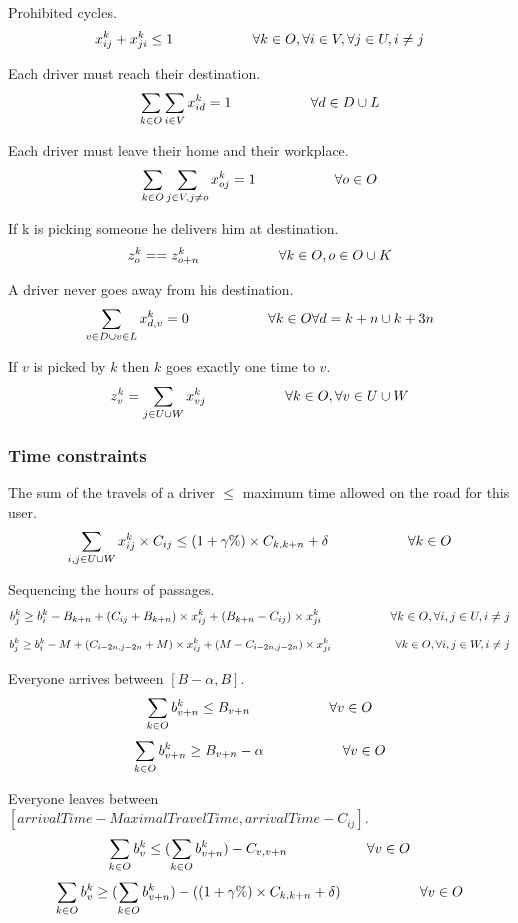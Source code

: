 \documentclass[12pt, a4paper, twoside]{memoir}
\newcommand\tab[1][1cm]{\hspace*{#1}}
\begin{document}
{	Prohibited cycles.
	\[ x^{k}_{ij}+x^{k}_{ji}\leq1\tab \tab \forall k\in O, \forall i\in V, \forall j\in U, i\ne j \]
	
	Each driver must reach their destination.
	\[ \sum_{\substack{k\in O}}\sum_{\substack{i \in V}} x^{k}_{id}=1 \tab \tab \forall d\in D\cup L \]
	
	Each driver must leave their home and their workplace. 
	\[ \sum_{\substack{k\in O}}\sum_{\substack{j \in V, j\ne o}} x^{k}_{oj}=1\tab \tab \forall o\in O \]

	If k is picking someone he delivers him at destination.
	\[ z^{k}_{o}==z^{k}_{o+n}\tab \tab \forall k\in O, o\in O\cup K \] 
	
	A driver never goes away from his destination.
	\[ \sum_{\substack{v\in D\cup v\in L}} x^{k}_{d, v}=0\tab \tab \forall k\in O \forall d=k+n\cup k+3n\]
	
	If $v$ is picked by $k$ then $k$ goes exactly one time to $v$.
	\[ z^{k}_{v}=\sum_{\substack{j\in U\cup W}} x^{k}_{vj} \tab \tab \forall k\in O, \forall v\in U\cup W \]
	
	\subsubsection{Time constraints}
	
	The sum of the travels of a driver $\leq$ maximum time allowed on the road for this user.
	\[ \sum_{\substack{i, j\in U\cup W}}x^{k}_{ij}\times C_{ij}\leq (1+\gamma \% )\times C_{k, k+n}+\delta \tab \tab \forall k\in O \]
	
	Sequencing the hours of passages.
	\[ b^{k}_{j}\geq b^{k}_{i}-B_{k+n}+(C_{ij}+B_{k+n})\times x^{k}_{ij}+(B_{k+n}-C_{ij})\times x^{k}_{ji}\tab \tab \forall k\in O, \forall i, j\in U, i\neq j \]
	\[ b^{k}_{j}\geq b^{k}_{i}-M+(C_{i-2n, j-2n}+M)\times x^{k}_{ij}+(M-C_{i-2n, j-2n})\times x^{k}_{ji}\tab \tab \forall k\in O, \forall i, j\in W, i\neq j \]
	
	Everyone arrives between $[B-\alpha , B]$.
	\[ \sum_{\substack{k\in O}}b^{k}_{v+n}\leq B_{v+n} \tab \tab \forall v\in O \]
	\[ \sum_{\substack{k\in O}}b^{k}_{v+n}\geq B_{v+n} - \alpha \tab \tab \forall v\in O \]
	
	Everyone leaves between $[arrival Time-MaximalTravelTime , arrival Time - C_{ij}]$.
	\[ \sum_{\substack{k\in O}}b^{k}_{v}\leq (\sum_{\substack{k\in O}} b^{k}_{v+n})- C_{v, v+n} \tab \tab \forall v\in O \]
	\[ \sum_{\substack{k\in O}}b^{k}_{v}\geq (\sum_{\substack{k\in O}} b^{k}_{v+n})- ((1+\gamma \% )\times C_{k, k+n}+\delta ) \tab \tab \forall v\in O \]
	
}
\end{document}
